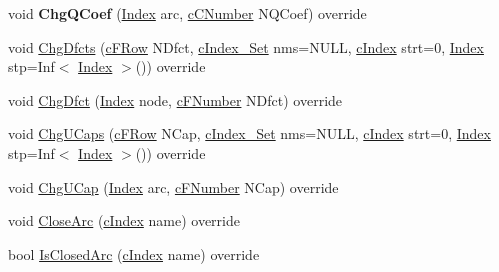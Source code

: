 \begin{DoxyCompactItemize}
\item 
\mbox{\label{class_m_c_f_cplex_aab2b19d2ad4d8b8d3082bf6e67888d5c}} 
void {\bfseries Chg\+Q\+Coef} (\mbox{\hyperlink{class_m_c_f_class_ad53d6229d7ec28555a9c9c2fd9abf773}{Index}} arc, \mbox{\hyperlink{class_m_c_f_class_a07dbefeeb08c3f63073622411893eb76}{c\+C\+Number}} N\+Q\+Coef) override
\item 
void \mbox{\hyperlink{class_m_c_f_cplex_aa45a772ac26eddf9fa9e3f2991b71cc4}{Chg\+Dfcts}} (\mbox{\hyperlink{class_m_c_f_class_ad325f3193dbba0ddef1da4e72d29eda6}{c\+F\+Row}} N\+Dfct, \mbox{\hyperlink{class_m_c_f_class_a81575b2d4e4d5636b17170432150ae69}{c\+Index\+\_\+\+Set}} nms=N\+U\+LL, \mbox{\hyperlink{class_m_c_f_class_a76aaabb20535c51a2752b93f6c38fe54}{c\+Index}} strt=0, \mbox{\hyperlink{class_m_c_f_class_ad53d6229d7ec28555a9c9c2fd9abf773}{Index}} stp=Inf$<$ \mbox{\hyperlink{class_m_c_f_class_ad53d6229d7ec28555a9c9c2fd9abf773}{Index}} $>$()) override
\item 
void \mbox{\hyperlink{class_m_c_f_cplex_ac4849627bb960b6c55f4b0f4e931b48b}{Chg\+Dfct}} (\mbox{\hyperlink{class_m_c_f_class_ad53d6229d7ec28555a9c9c2fd9abf773}{Index}} node, \mbox{\hyperlink{class_m_c_f_class_a11f747fbdff346237c8db4469d569994}{c\+F\+Number}} N\+Dfct) override
\item 
void \mbox{\hyperlink{class_m_c_f_cplex_a238981895a2a951e54f9dbabd175728f}{Chg\+U\+Caps}} (\mbox{\hyperlink{class_m_c_f_class_ad325f3193dbba0ddef1da4e72d29eda6}{c\+F\+Row}} N\+Cap, \mbox{\hyperlink{class_m_c_f_class_a81575b2d4e4d5636b17170432150ae69}{c\+Index\+\_\+\+Set}} nms=N\+U\+LL, \mbox{\hyperlink{class_m_c_f_class_a76aaabb20535c51a2752b93f6c38fe54}{c\+Index}} strt=0, \mbox{\hyperlink{class_m_c_f_class_ad53d6229d7ec28555a9c9c2fd9abf773}{Index}} stp=Inf$<$ \mbox{\hyperlink{class_m_c_f_class_ad53d6229d7ec28555a9c9c2fd9abf773}{Index}} $>$()) override
\item 
void \mbox{\hyperlink{class_m_c_f_cplex_a00e86718fdd12d417a945d7e146d5b4d}{Chg\+U\+Cap}} (\mbox{\hyperlink{class_m_c_f_class_ad53d6229d7ec28555a9c9c2fd9abf773}{Index}} arc, \mbox{\hyperlink{class_m_c_f_class_a11f747fbdff346237c8db4469d569994}{c\+F\+Number}} N\+Cap) override
\item 
void \mbox{\hyperlink{class_m_c_f_cplex_a4a964ce79159307998f5acd0018d01b1}{Close\+Arc}} (\mbox{\hyperlink{class_m_c_f_class_a76aaabb20535c51a2752b93f6c38fe54}{c\+Index}} name) override
\item 
bool \mbox{\hyperlink{class_m_c_f_cplex_a95d97fdf20e0075a8deda52f4925072a}{Is\+Closed\+Arc}} (\mbox{\hyperlink{class_m_c_f_class_a76aaabb20535c51a2752b93f6c38fe54}{c\+Index}} name) override

\end{DoxyCompactItemize}
